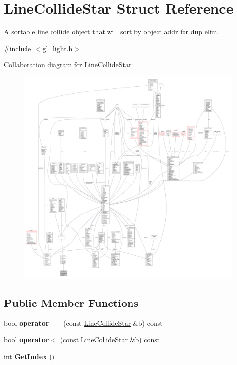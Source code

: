 \hypertarget{structLineCollideStar}{}\section{Line\+Collide\+Star Struct Reference}
\label{structLineCollideStar}


A sortable line collide object that will sort by object addr for dup elim.  




{\ttfamily \#include $<$gl\+\_\+light.\+h$>$}



Collaboration diagram for Line\+Collide\+Star\+:
\nopagebreak
\begin{figure}[H]
\begin{center}
\leavevmode
\includegraphics[width=350pt]{d9/d75/structLineCollideStar__coll__graph}
\end{center}
\end{figure}
\subsection*{Public Member Functions}
\begin{DoxyCompactItemize}
\item 
bool {\bfseries operator==} (const \hyperlink{structLineCollideStar}{Line\+Collide\+Star} \&b) const \hypertarget{structLineCollideStar_ace3076f431271c2a940964c2c3ba22d4}{}\label{structLineCollideStar_ace3076f431271c2a940964c2c3ba22d4}

\item 
bool {\bfseries operator$<$} (const \hyperlink{structLineCollideStar}{Line\+Collide\+Star} \&b) const \hypertarget{structLineCollideStar_a38f2efc05a9e174c2aa65ee86140b52d}{}\label{structLineCollideStar_a38f2efc05a9e174c2aa65ee86140b52d}

\item 
int {\bfseries Get\+Index} ()\hypertarget{structLineCollideStar_a951365f0a177cf41da31111612ca3329}{}\label{structLineCollideStar_a951365f0a177cf41da31111612ca3329}

\end{DoxyCompactItemize}
